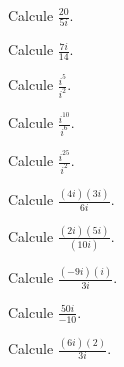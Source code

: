 \begin{ejercicio}
Calcule $\displaystyle \frac{20}{5i}$.
\end{ejercicio}

\begin{ejercicio}
Calcule $\displaystyle \frac{7i}{14}$.
\end{ejercicio}

\begin{ejercicio}
Calcule $\displaystyle \frac{i^5}{i^2}$.
\end{ejercicio}

\begin{ejercicio}
Calcule $\displaystyle \frac{i^{10}}{i^6}$.
\end{ejercicio}

\begin{ejercicio}
Calcule $\displaystyle \frac{i^{25}}{i^2}$.
\end{ejercicio}

\begin{ejercicio}
Calcule $\displaystyle \frac{(4i)(3i)}{6i}$.
\end{ejercicio}

\begin{ejercicio}
Calcule $\displaystyle \frac{(2i)(5i)}{(10i)}$.
\end{ejercicio}

\begin{ejercicio}
Calcule $\displaystyle \frac{(-9i)(i)}{3i}$.
\end{ejercicio}

\begin{ejercicio}
Calcule $\displaystyle \frac{50i}{-10}$.
\end{ejercicio}

\begin{ejercicio}
Calcule $\displaystyle \frac{(6i)(2)}{3i}$.
\end{ejercicio}

